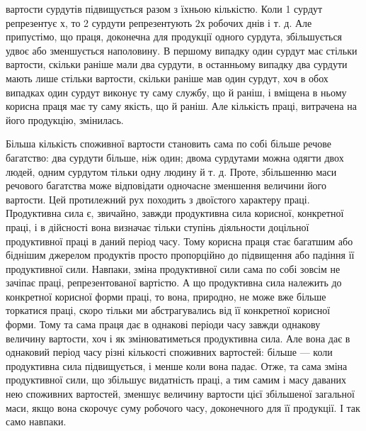 \parcont{}  %
вартости сурдутів підвищується разом з їхньою кількістю. Коли
1 сурдут репрезентує $х$, то 2 сурдути репрезентують $2х$ робочих
днів і т. д. Але припустімо, що праця, доконечна для продукції
одного сурдута, збільшується удвоє або зменшується наполовину.
В першому випадку один сурдут має стільки вартости, скільки
раніше мали два сурдути, в останньому випадку два сурдути
мають лише стільки вартости, скільки раніше мав один сурдут,
хоч в обох випадках один сурдут виконує ту саму службу, що й
раніш, і вміщена в ньому корисна праця має ту саму якість, що
й раніш. Але кількість праці, витрачена на його продукцію,
змінилась.

Більша кількість споживної вартости становить сама по собі
більше речове багатство: два сурдути більше, ніж один; двома
сурдутами можна одягти двох людей, одним сурдутом тільки одну
людину й т. д. Проте, збільшенню маси речового багатства може
відповідати одночасне зменшення величини його вартости. Цей
протилежний рух походить з двоїстого характеру праці. Продуктивна
сила є, звичайно, завжди продуктивна сила корисної, конкретної
праці, і в дійсності вона визначає тільки ступінь діяльности
доцільної продуктивної праці в даний період часу. Тому
корисна праця стає багатшим або біднішим джерелом продуктів
просто пропорційно до підвищення або падіння її продуктивної
сили. Навпаки, зміна продуктивної сили сама по собі зовсім не
зачіпає праці, репрезентованої вартістю. А що продуктивна сила належить
до конкретної корисної форми праці, то вона, природно, не
може вже більше торкатися праці, скоро тільки ми абстрагувались
від її конкретної корисної форми. Тому та сама праця дає в однакові
періоди часу завжди однакову величину вартости, хоч і як
змінюватиметься продуктивна сила. Але вона дає в однаковий
період часу різні кількості споживних вартостей: більше — коли
продуктивна сила підвищується, і менше коли вона падає. Отже,
та сама зміна продуктивної сили, що збільшує видатність праці,
а тим самим і масу даваних нею споживних вартостей, зменшує
величину вартости цієї збільшеної загальної маси, якщо вона
скорочує суму робочого часу, доконечного для її продукції. І так
само навпаки.

